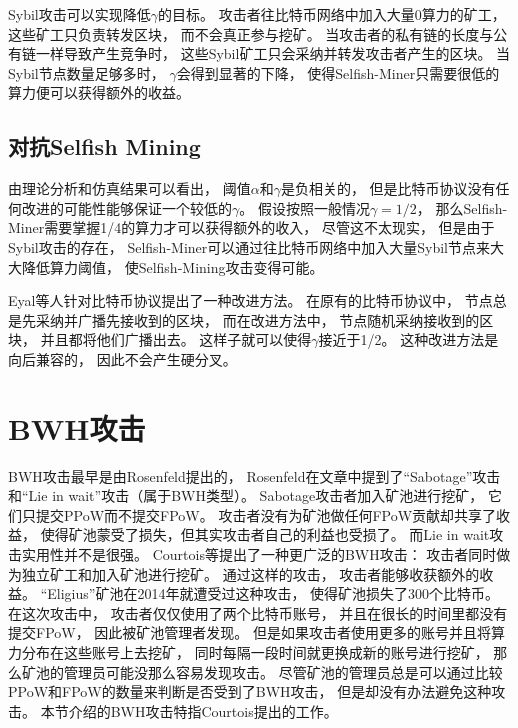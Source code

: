 \documentclass[a4paper, 11pt]{article}
\begin{document}
\begin{CJK*}{UTF8}{gbsn}
    Sybil攻击可以实现降低$\gamma$的目标。
    攻击者往比特币网络中加入大量0算力的矿工，
    这些矿工只负责转发区块，
    而不会真正参与挖矿。
    当攻击者的私有链的长度与公有链一样导致产生竞争时，
    这些Sybil矿工只会采纳并转发攻击者产生的区块。
    当Sybil节点数量足够多时，
    $\gamma$会得到显著的下降，
    使得Selfish-Miner只需要很低的算力便可以获得额外的收益。

    \subsection{对抗Selfish Mining}

    \indent

    由理论分析和仿真结果可以看出，
    阈值$\alpha$和$\gamma$是负相关的，
    但是比特币协议没有任何改进的可能性能够保证一个较低的$\gamma$。
    假设按照一般情况$\gamma = 1/2$，
    那么Selfish-Miner需要掌握1/4的算力才可以获得额外的收入，
    尽管这不太现实，
    但是由于Sybil攻击的存在，
    Selfish-Miner可以通过往比特币网络中加入大量Sybil节点来大大降低算力阈值，
    使Selfish-Mining攻击变得可能。

    Eyal等人针对比特币协议提出了一种改进方法。
    在原有的比特币协议中，
    节点总是先采纳并广播先接收到的区块，
    而在改进方法中，
    节点随机采纳接收到的区块，
    并且都将他们广播出去。
    这样子就可以使得$\gamma$接近于1/2。
    这种改进方法是向后兼容的，
    因此不会产生硬分叉。

    \section{BWH攻击}

    \indent

    BWH攻击最早是由Rosenfeld\cite{ref_BWH1}提出的，
    Rosenfeld在文章中提到了“Sabotage”攻击和“Lie in wait”攻击（属于BWH类型）。
    Sabotage攻击者加入矿池进行挖矿，
    它们只提交PPoW而不提交FPoW。
    攻击者没有为矿池做任何FPoW贡献却共享了收益，
    使得矿池蒙受了损失，但其实攻击者自己的利益也受损了。
    而Lie in wait攻击实用性并不是很强。
    Courtois\cite{ref_BWH2}等提出了一种更广泛的BWH攻击：
    攻击者同时做为独立矿工和加入矿池进行挖矿。
    通过这样的攻击，
    攻击者能够收获额外的收益。
    “Eligius”矿池在2014年就遭受过这种攻击，
    使得矿池损失了300个比特币\cite{ref_web5}。
    在这次攻击中，
    攻击者仅仅使用了两个比特币账号，
    并且在很长的时间里都没有提交FPoW，
    因此被矿池管理者发现。
    但是如果攻击者使用更多的账号并且将算力分布在这些账号上去挖矿，
    同时每隔一段时间就更换成新的账号进行挖矿，
    那么矿池的管理员可能没那么容易发现攻击。
    尽管矿池的管理员总是可以通过比较PPoW和FPoW的数量来判断是否受到了BWH攻击，
    但是却没有办法避免这种攻击。
    本节介绍的BWH攻击特指Courtois提出的工作\cite{ref_BWH2}。


\end{CJK*}
\end{document}
